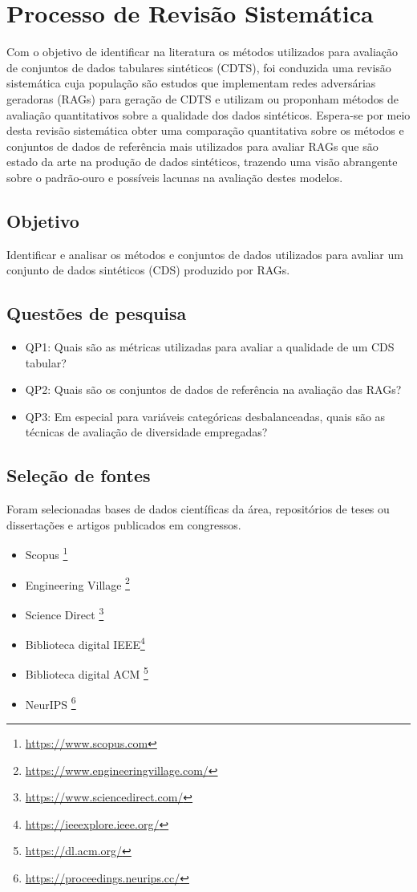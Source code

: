 \chapter{Processo de Revisão Sistemática}

Com o objetivo de identificar na literatura os métodos utilizados para avaliação de conjuntos de dados tabulares sintéticos (CDTS), foi conduzida uma revisão sistemática cuja população são estudos que implementam redes adversárias geradoras (RAGs) para geração de CDTS e utilizam ou proponham métodos de avaliação quantitativos sobre a qualidade dos dados sintéticos.
Espera-se por meio desta revisão sistemática obter uma comparação quantitativa sobre os métodos e conjuntos de dados de referência mais utilizados para avaliar RAGs que são estado da arte na produção de dados sintéticos, trazendo uma visão abrangente sobre o padrão-ouro e possíveis lacunas na avaliação destes modelos.

\section{Objetivo}

Identificar e analisar os métodos e conjuntos de dados utilizados para avaliar um conjunto de dados sintéticos (CDS) produzido por RAGs.

\section{Questões de pesquisa}
\label{questions}
\begin{itemize}
    \item QP1: Quais são as métricas utilizadas para avaliar a qualidade de um CDS tabular?
    \item QP2: Quais são os conjuntos de dados de referência na avaliação das RAGs?
    \item QP3: Em especial para variáveis categóricas desbalanceadas, quais são as técnicas de avaliação de diversidade empregadas?
\end{itemize}


\section{Seleção de fontes}
Foram selecionadas bases de dados científicas da área, repositórios de teses ou dissertações e artigos publicados em congressos.

\label{sources}
\begin{itemize}
    \item Scopus \footnote{\url{https://www.scopus.com}}
    \item Engineering Village \footnote{\url{https://www.engineeringvillage.com/}}
    \item Science Direct \footnote{\url{https://www.sciencedirect.com/}}
    \item Biblioteca digital IEEE\footnote{\url{https://ieeexplore.ieee.org/}}
    \item Biblioteca digital ACM \footnote{\url{https://dl.acm.org/}}
    \item NeurIPS \footnote{\url{https://proceedings.neurips.cc/}}
\end{itemize}

